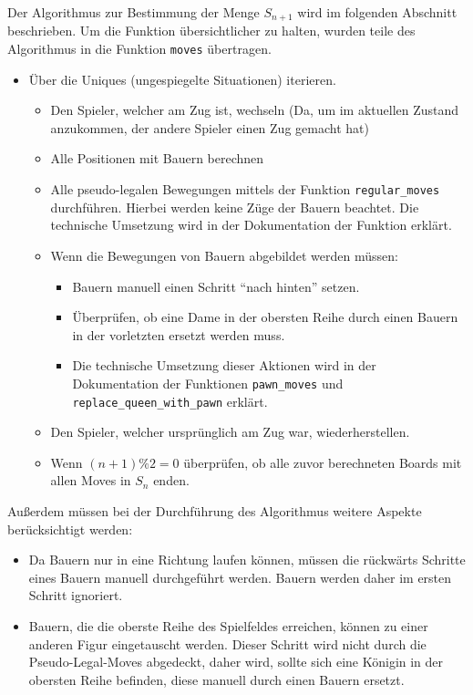 \documentclass[12pt]{article}
\providecommand{\tightlist}{%
      \setlength{\itemsep}{0pt}\setlength{\parskip}{0pt}}
\begin{document}
Der Algorithmus zur Bestimmung der Menge \(S_{n+1}\) wird im folgenden
Abschnitt beschrieben. Um die Funktion übersichtlicher zu halten, wurden
teile des Algorithmus in die Funktion \texttt{moves} übertragen.

\begin{itemize}
\tightlist
\item
  Über die Uniques (ungespiegelte Situationen) iterieren.

  \begin{itemize}
  \tightlist
  \item
    Den Spieler, welcher am Zug ist, wechseln (Da, um im aktuellen
    Zustand anzukommen, der andere Spieler einen Zug gemacht hat)
  \item
    Alle Positionen mit Bauern berechnen
  \item
    Alle pseudo-legalen Bewegungen mittels der Funktion
    \texttt{regular\_moves} durchführen. Hierbei werden keine Züge der
    Bauern beachtet. Die technische Umsetzung wird in der Dokumentation
    der Funktion erklärt.
  \item
    Wenn die Bewegungen von Bauern abgebildet werden müssen:

    \begin{itemize}
    \tightlist
    \item
      Bauern manuell einen Schritt ``nach hinten'' setzen.
    \item
      Überprüfen, ob eine Dame in der obersten Reihe durch einen Bauern
      in der vorletzten ersetzt werden muss.
    \item
      Die technische Umsetzung dieser Aktionen wird in der Dokumentation
      der Funktionen \texttt{pawn\_moves} und
      \texttt{replace\_queen\_with\_pawn} erklärt.
    \end{itemize}
  \item
    Den Spieler, welcher ursprünglich am Zug war, wiederherstellen.
  \item
    Wenn \((n+1) \% 2 = 0\) überprüfen, ob alle zuvor berechneten Boards
    mit allen Moves in \(S_n\) enden.
  \end{itemize}
\end{itemize}

Außerdem müssen bei der Durchführung des Algorithmus weitere Aspekte
berücksichtigt werden:

\begin{itemize}
\tightlist
\item
  Da Bauern nur in eine Richtung laufen können, müssen die rückwärts
  Schritte eines Bauern manuell durchgeführt werden. Bauern werden daher
  im ersten Schritt ignoriert.
\item
  Bauern, die die oberste Reihe des Spielfeldes erreichen, können zu
  einer anderen Figur eingetauscht werden. Dieser Schritt wird nicht
  durch die Pseudo-Legal-Moves abgedeckt, daher wird, sollte sich eine
  Königin in der obersten Reihe befinden, diese manuell durch einen
  Bauern ersetzt.
\end{itemize}
\end{document}
